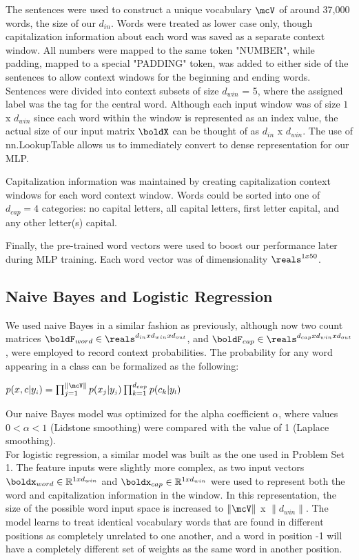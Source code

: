 \documentclass[11pt]{article}
\begin{document}
The sentences were used to construct a unique vocabulary $\mcV$ of around 37,000 words, the size of our $d_{in}$. Words were treated as lower case only, though capitalization information about each word was saved as a separate context window. All numbers were mapped to the same token "NUMBER", while padding, mapped to a special "PADDING" token, was added to either side of the sentences to allow context windows for the beginning and ending words. Sentences were divided into context subsets of size $d_{win}$ = 5, where the assigned label was the tag for the central word. Although each input window was of size $1$ x $d_{win}$ since each word within the window is represented as an index value, the actual size of our input matrix $\boldX$ can be thought of as $d_{in}$ x $d_{win}$. The use of nn.LookupTable allows us to immediately convert to dense representation for our MLP.

Capitalization information was maintained by creating capitalization context windows for each word context window. Words could be sorted into one of $d_{cap} = 4$ categories: no capital letters, all capital letters, first letter capital, and any other letter(s) capital.

Finally, the pre-trained word vectors were used to boost our performance later during MLP training. Each word vector was of dimensionality $\reals^{1 x 50}$.

\subsection{Naive Bayes and Logistic Regression}

We used naive Bayes in a similar fashion as previously, although now two count matrices $\boldF_{word} \in \reals^{d_{in} x d_{win} x d_{out}}$, and $\boldF_{cap} \in \reals^{d_{cap} x d_{win} x d_{out}}$, were employed to record context probabilities. The probability for any word appearing in a class can be formalized as the following:
\begin{center}
$p(x, c|y_{\scriptscriptstyle i}) = \prod_{j=1}^{\|\mcV\|} p(x_{j}|y_{\scriptscriptstyle j})\prod_{k=1}^{d_{cap}}p(c_{k}|y_{\scriptscriptstyle l})$
\end{center}

Our naive Bayes model was optimized for the alpha coefficient $\alpha$, where values $0 < \alpha < 1$ (Lidstone smoothing) were compared with the value of 1 (Laplace smoothing).\\

For logistic regression, a similar model was built as the one used in Problem Set 1. The feature inputs were slightly more complex, as two input vectors $\boldx_{word} \in \mathbb{R}^{1 x d_{win}}$ and $\boldx_{cap} \in \mathbb{R}^{1 x d_{win}}$ were used to represent both the word and capitalization information in the window. In this representation, the size of the possible word input space is increased to $\|\mcV\|$ x $\|d_{win}\|$. The model learns to treat identical vocabulary words that are found in different positions as completely unrelated to one another, and a word in position -1 will have a completely different set of weights as the same word in another position.
\end{document}

